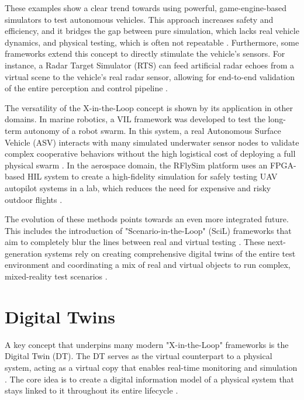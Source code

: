 These examples show a clear trend towards using powerful, game-engine-based simulators to test autonomous vehicles. This approach increases safety and efficiency, and it bridges the gap between pure simulation, which lacks real vehicle dynamics, and physical testing, which is often not repeatable \cite{Cao2023}. Furthermore, some frameworks extend this concept to directly stimulate the vehicle's sensors. For instance, a Radar Target Simulator (RTS) can feed artificial radar echoes from a virtual scene to the vehicle's real radar sensor, allowing for end-to-end validation of the entire perception and control pipeline \cite{Diewald2021}.


The versatility of the X-in-the-Loop concept is shown by its application in other domains. In marine robotics, a VIL framework was developed to test the long-term autonomy of a robot swarm. In this system, a real Autonomous Surface Vehicle (ASV) interacts with many simulated underwater sensor nodes to validate complex cooperative behaviors without the high logistical cost of deploying a full physical swarm \cite{Babic2020}. In the aerospace domain, the RFlySim platform uses an FPGA-based HIL system to create a high-fidelity simulation for safely testing UAV autopilot systems in a lab, which reduces the need for expensive and risky outdoor flights \cite{Dai2021}.

The evolution of these methods points towards an even more integrated future. This includes the introduction of "Scenario-in-the-Loop" (SciL) frameworks that aim to completely blur the lines between real and virtual testing \cite{Szalay2021}. These next-generation systems rely on creating comprehensive digital twins of the entire test environment and coordinating a mix of real and virtual objects to run complex, mixed-reality test scenarios \cite{Szalay2021}.

\section{Digital Twins}
\label{sec:DT}
A key concept that underpins many modern "X-in-the-Loop" frameworks is the Digital Twin (DT). The DT serves as the virtual counterpart to a physical system, acting as a virtual copy that enables real-time monitoring and simulation \cite{Alnowaiser2023}. The core idea is to create a digital information model of a physical system that stays linked to it throughout its entire lifecycle \cite{Grieves2017}.

